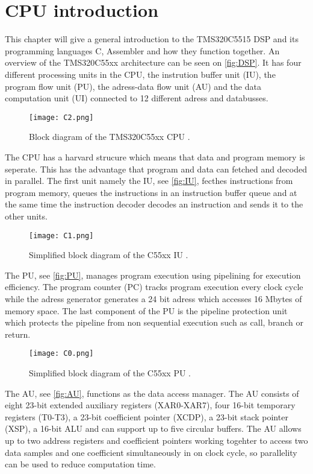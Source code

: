 \chapter{CPU introduction}
This chapter will give a general introduction to the TMS320C5515 DSP and its programming languages C, Assembler and how they function together. An overview of the TMS320C55xx architecture can be seen on \autoref{fig:DSP}. It has four different processing units in the CPU, the instrution buffer unit (IU), the program flow unit (PU), the adress-data flow unit (AU) and the data computation unit (UI) connected to 12 different adress and databusses.  
\begin{figure}[H]
\centering
\texttt{[image: C2.png]}
\caption{Block diagram of the TMS320C55xx CPU \citep{signalProcessBook}.}
\label{fig:DSP}
\end{figure}
The CPU has a harvard strucure which means that data and program memory is seperate. This has the advantage that program and data can fetched and decoded in parallel. The first unit namely the IU, see \autoref{fig:IU}, fecthes instructions from program memory, queues the instructions in an instruction buffer queue and at the same time the instruction decoder decodes an instruction and sends it to the other units.
\begin{figure}[H]
\centering
\texttt{[image: C1.png]}
\caption{Simplified block diagram of the C55xx IU \citep{signalProcessBook}.}
\label{fig:IU}
\end{figure}
The PU, see \autoref{fig:PU}, manages program execution using pipelining for execution efficiency. The program counter (PC) tracks program execution every clock cycle while the adress generator generates a 24 bit adress which accesses 16 Mbytes of memory space. The last component of the PU is the pipeline protection unit which protects the pipeline from non sequential execution such as call, branch or return.
\begin{figure}[H]
\centering
\texttt{[image: C0.png]}
\caption{Simplified block diagram of the C55xx PU \citep{signalProcessBook}.}
\label{fig:PU}
\end{figure}
The AU, see \autoref{fig:AU}, functions as the data access manager. The AU consists of eight 23-bit extended auxiliary registers (XAR0-XAR7), four 16-bit temporary registers (T0-T3), a 23-bit coefficient pointer (XCDP), a 23-bit stack pointer (XSP), a 16-bit ALU and can support up to five circular buffers. The AU allows up to two address registers and coefficient pointers working togehter to access two data samples and one coefficient simultaneously in on clock cycle, so parallelity can be used to reduce computation time. 

